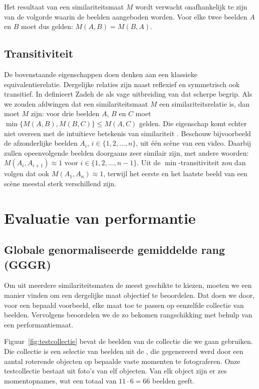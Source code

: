 Het resultaat van een similariteitsmaat $M$ wordt verwacht onafhankelijk te zijn van de 
volgorde waarin de beelden aangeboden worden. Voor elke twee beelden $A$ en $B$ moet dus gelden:
$M(A,B)=M(B,A)$.

\subsection{Transitiviteit}

De bovenstaande eigenschappen doen denken aan een klassieke equivalentierelatie. Dergelijke
relaties zijn naast reflexief en symmetrisch ook transitief. In 
\cite{zadeh:similarity_relations_and_fuzzy_orderings} definieert Zadeh
de  als vage uitbreiding van dat scherpe begrip. Als we zouden
afdwingen dat een similariteitsmaat $M$ een similariteitsrelatie is, dan moet $M$ 
 zijn: voor drie beelden $A$, $B$ en $C$ moet 
$\min\{M(A,B),M(B,C)\} \le M(A,C)$ gelden. Die
eigenschap komt echter niet overeen met de intu\"itieve betekenis van similariteit
\cite{de_cock:on_unsuitable_relations_for_approx_equal, de_cock:why_fuzzy_relations_do_not_resolve_pointcare_paradox}. 
Beschouw bijvoorbeeld de afzonderlijke beelden $A_i$, $i \in \{1,2,\ldots,n\}$, uit \'e\'en sc\`ene van een video. 
Daarbij zullen opeenvolgende beelden doorgaans zeer similair zijn, met andere woorden: 
$M(A_i,A_{i+1}) \approx 1$ voor $i \in \{1,2,\ldots,n-1\}$. Uit de $\min$-transitiviteit
zou dan volgen dat ook $M(A_1,A_n) \approx 1$, terwijl het eerste en het laatste beeld
van een sc\`ene meestal sterk verschillend zijn.   

\section{Evaluatie van performantie}

\subsection{Globale genormaliseerde gemiddelde rang (GGGR)}

Om uit meerdere similariteitsmaten de meest geschikte te kiezen, 
moeten we een manier vinden om een dergelijke maat objectief te beoordelen. 
Dat doen we door, voor een bepaald voorbeeld, elke maat toe te passen op eenzelfde collectie 
van beelden. Vervolgens beoordelen we de zo bekomen rangschikking met behulp van een performantiemaat.

Figuur~\ref{fig:testcollectie} bevat de beelden van de collectie die we gaan 
gebruiken. Die collectie is een selectie van beelden uit
de  \cite{coil-100}, die gegenereerd werd 
door een aantal roterende objecten op bepaalde vaste momenten te fotograferen. 
Onze testcollectie bestaat uit foto's van elf objecten. Van elk object zijn
er zes momentopnames, wat een totaal van $11 \cdot 6 = 66$ beelden geeft.

